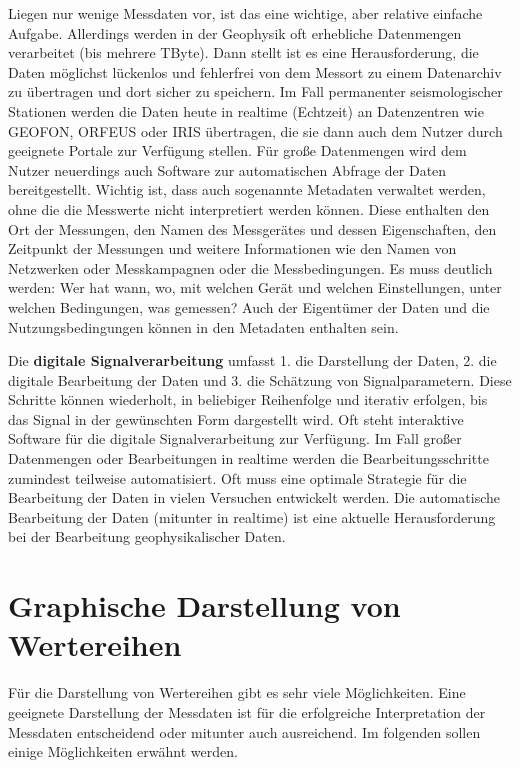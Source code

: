 Liegen nur wenige Messdaten vor, ist das 
eine wichtige, aber relative einfache Aufgabe. Allerdings werden in der Geophysik oft erhebliche Datenmengen verarbeitet (bis mehrere TByte). Dann stellt ist es eine Herausforderung, die Daten möglichst lückenlos und fehlerfrei von dem Messort zu einem Datenarchiv zu übertragen und dort sicher zu speichern. Im Fall permanenter seismologischer Stationen werden die Daten heute in realtime (Echtzeit) an Datenzentren wie GEOFON, ORFEUS oder IRIS übertragen, die sie dann auch dem Nutzer durch geeignete Portale zur Verfügung stellen. Für große Datenmengen wird dem Nutzer neuerdings auch Software zur automatischen Abfrage der Daten bereitgestellt. Wichtig ist, dass auch sogenannte Metadaten verwaltet werden, ohne die die Messwerte nicht interpretiert werden können. Diese enthalten den Ort der Messungen, den Namen des Messgerätes und dessen Eigenschaften, den Zeitpunkt der Messungen und weitere Informationen wie den Namen von Netzwerken oder Messkampagnen oder die Messbedingungen. Es muss deutlich werden: Wer hat wann, wo, mit welchen Gerät und welchen Einstellungen, unter welchen Bedingungen, was gemessen? Auch der Eigentümer der Daten und die Nutzungsbedingungen können in den Metadaten enthalten sein.

Die {\bf digitale Signalverarbeitung} umfasst 1. die Darstellung der Daten, 2. die digitale Bearbeitung der Daten und 3. die Schätzung von Signalparametern. Diese Schritte können wiederholt, in beliebiger Reihenfolge und iterativ erfolgen, bis das Signal in der gewünschten Form dargestellt wird. Oft steht interaktive Software für die digitale Signalverarbeitung zur Verfügung. Im Fall großer Datenmengen oder Bearbeitungen in realtime werden die Bearbeitungsschritte zumindest teilweise automatisiert. Oft muss eine optimale Strategie für die Bearbeitung der Daten in vielen Versuchen entwickelt werden. Die automatische Bearbeitung der Daten (mitunter in realtime) ist eine aktuelle Herausforderung bei der Bearbeitung geophysikalischer Daten.

\newpage


\section{Graphische Darstellung von Wertereihen}
Für die Darstellung von Wertereihen gibt es sehr viele Möglichkeiten. Eine geeignete Darstellung der Messdaten ist für die erfolgreiche Interpretation der Messdaten entscheidend oder mitunter auch ausreichend. Im folgenden sollen einige Möglichkeiten erwähnt werden.\\[.5cm]

